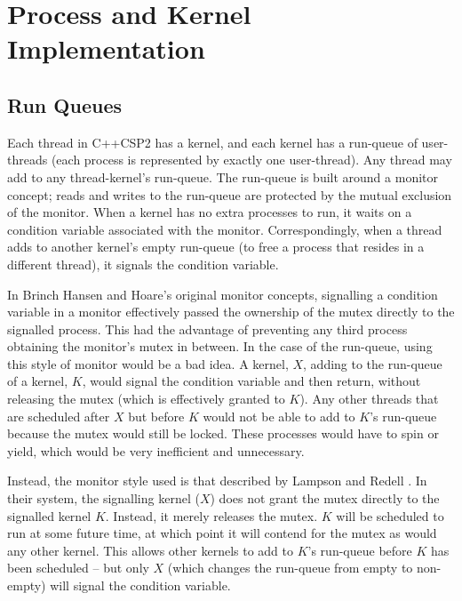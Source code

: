 \documentclass[12pt]{IOS-Book-Article-CPA-2007}
\begin{document}
\section{Process and Kernel Implementation}

\label{sec-miscprocess}

\subsection{Run Queues}

\label{sec-runqueue}

Each thread in C++CSP2 has a kernel, and each kernel has a run-queue of user-threads (each process is represented by exactly one user-thread).  Any 
thread may add to any thread-kernel's run-queue.  The run-queue is built around a monitor concept; reads and writes to the run-queue are protected 
by the mutual exclusion of the monitor.  When a kernel has no extra processes to run, it waits on a condition variable associated with the monitor.  
Correspondingly, when a thread adds to another kernel's empty run-queue (to free a process that resides in a different thread), it signals the condition variable. 

In Brinch Hansen \cite{brinch-hansen-osprinciples-73} and Hoare's \cite{hoare-monitors-74} original monitor concepts, signalling a condition variable in a 
monitor effectively passed the ownership of the mutex directly to the signalled process.  This had the advantage of preventing any third process 
obtaining the monitor's mutex in between.  In the case of the run-queue, using this style of monitor would be a bad idea.  A kernel, $X$, adding to the 
run-queue of a kernel, $K$, would signal the condition variable and then return, without releasing the mutex (which is effectively granted to  
$K$).  Any other threads that are scheduled after $X$ but before $K$ would not be able to add to $K$'s run-queue because the mutex would still be 
locked.  These processes would have to spin or yield, which would be very inefficient and unnecessary.

Instead, the monitor style used is that described by Lampson and Redell \cite{lampson-monitors-80}.  In their system, the signalling kernel ($X$) does 
not grant the mutex directly to the signalled kernel $K$.  Instead, it merely releases the mutex.  $K$ will be scheduled to run at some future time, 
at which point it will contend for the mutex as would any other kernel.  This allows other kernels to add to $K$'s run-queue before $K$ has been 
scheduled -- but only $X$ (which changes the run-queue from empty to non-empty) will signal the condition variable.
\end{document}
